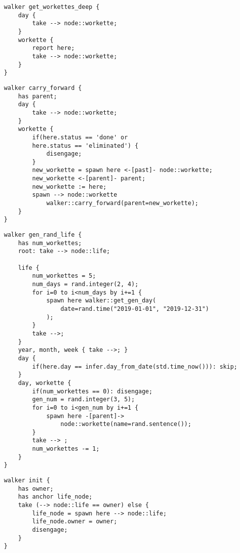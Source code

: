 \begin{lstlisting}[caption={Get workette and all derivitive workettes}]
walker get_workettes_deep {
    day {
        take --> node::workette;
    }
    workette {
        report here;
        take --> node::workette;
    }
}
\end{lstlisting}


\begin{lstlisting}[caption={Automatically copy and link prior day's workettes}]
walker carry_forward {
    has parent;
    day {
        take --> node::workette;
    }
    workette {
        if(here.status == 'done' or
        here.status == 'eliminated') {
            disengage;
        }
        new_workette = spawn here <-[past]- node::workette;
        new_workette <-[parent]- parent;
        new_workette := here;
        spawn --> node::workette
            walker::carry_forward(parent=new_workette);
    }
}
\end{lstlisting}


\begin{lstlisting}[caption={Generate random data for 2019}]
walker gen_rand_life {
    has num_workettes;
    root: take --> node::life;

    life {
        num_workettes = 5;
        num_days = rand.integer(2, 4);
        for i=0 to i<num_days by i+=1 {
            spawn here walker::get_gen_day(
                date=rand.time("2019-01-01", "2019-12-31")
            );
        }
        take -->;
    }
    year, month, week { take -->; }
    day {
        if(here.day == infer.day_from_date(std.time_now())): skip;
    }
    day, workette {
        if(num_workettes == 0): disengage;
        gen_num = rand.integer(3, 5);
        for i=0 to i<gen_num by i+=1 {
            spawn here -[parent]->
                node::workette(name=rand.sentence());
        }
        take --> ;
        num_workettes -= 1;
    }
}
\end{lstlisting}


\begin{lstlisting}[caption={Connect a life node to root}]
walker init {
    has owner;
    has anchor life_node;
    take (--> node::life == owner) else {
        life_node = spawn here --> node::life;
        life_node.owner = owner;
        disengage;
    }
}
\end{lstlisting}
